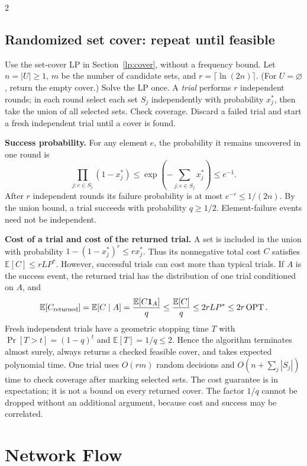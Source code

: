 \documentclass[10pt]{article}
\theoremstyle{definition}
\newcommand{\OPT}{\operatorname{OPT}}
\begin{document}
\begin{multicols*}{2}
\subsection{Randomized set cover: repeat until feasible}\label{lp:random-cover}
Use the set-cover LP in Section~\ref{lp:cover}, without a frequency bound.
Let $n=|U|\ge1$, $m$ be the number of candidate sets, and
$r=\lceil\ln(2n)\rceil$. (For $U=\varnothing$, return the empty cover.)
Solve the LP once. A \emph{trial} performs $r$ independent rounds; in each
round select each set $S_j$ independently with probability $x_j^*$, then
take the union of all selected sets. Check coverage. Discard a failed trial
and start a fresh independent trial until a cover is found.

\textbf{Success probability.}
For any element $e$, the probability it remains uncovered in one round is
\[
  \prod_{j:e\in S_j}(1-x_j^*)
    \le\exp\left(-\sum_{j:e\in S_j}x_j^*\right)\le e^{-1}.
\]
After $r$ independent rounds its failure probability is at most
$e^{-r}\le1/(2n)$. By the union bound, a trial succeeds with probability
$q\ge1/2$. Element-failure events need not be independent.

\textbf{Cost of a trial and cost of the returned trial.}
A set is included in the union with probability
$1-(1-x_j^*)^r\le r x_j^*$. Thus its nonnegative total cost $C$ satisfies
$\mathbb E[C]\le rLP^*$. However, successful trials can cost more than
typical trials. If $A$ is the success event, the returned trial has the
distribution of one trial conditioned on $A$, and
\[
  \mathbb E[C_{\rm returned}]
    =\mathbb E[C\mid A]
    =\frac{\mathbb E[C\mathbf 1_A]}q
    \le\frac{\mathbb E[C]}q
    \le2rLP^*\le2r\OPT.
\]
Fresh independent trials have a geometric stopping time $T$ with
$\Pr[T>t]=(1-q)^t$ and $\mathbb E[T]=1/q\le2$. Hence the algorithm
terminates almost surely, always returns a checked feasible cover, and
takes expected polynomial time. One trial uses $O(rm)$ random decisions
and $O(n+\sum_j|S_j|)$ time to check coverage after marking selected sets.
The cost guarantee is in expectation; it is not a bound on every returned
cover. The factor $1/q$ cannot be dropped without an additional argument,
because cost and success may be correlated.


\clearpage

\section{Network Flow}\label{nf:chapter}


\end{multicols*}
\end{document}
